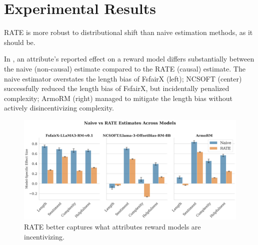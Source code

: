 \documentclass{article}
\begin{document}
\section{Experimental Results}
RATE is more robust to distributional shift than naive estimation methods, as it should be.

In , an attribute's reported effect on a reward model differs substantially between the naive (non-causal) estimate compared to the RATE (causal) estimate. The naive estimator overstates the length bias of FsfairX (left); NCSOFT (center) successfully reduced the length bias of FsfairX, but incidentally penalized complexity; ArmoRM (right) managed to mitigate the length bias without actively disincentivizing complexity.

\vspace{-0.5cm}

\begin{figure}[h]
    \centering
    \includegraphics[width=0.8\linewidth]{figures/naive.png}
    \caption{RATE better captures what attributes reward models are incentivizing.}
    \label{fig:naive}
\end{figure}
\end{document}
